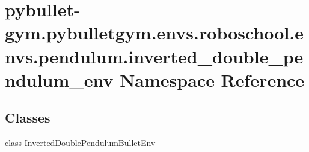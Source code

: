 \hypertarget{namespacepybullet-gym_1_1pybulletgym_1_1envs_1_1roboschool_1_1envs_1_1pendulum_1_1inverted__double__pendulum__env}{}\section{pybullet-\/gym.pybulletgym.\+envs.\+roboschool.\+envs.\+pendulum.\+inverted\+\_\+double\+\_\+pendulum\+\_\+env Namespace Reference}
\label{namespacepybullet-gym_1_1pybulletgym_1_1envs_1_1roboschool_1_1envs_1_1pendulum_1_1inverted__double__pendulum__env}
\subsection*{Classes}
\begin{DoxyCompactItemize}
\item 
class \hyperlink{classpybullet-gym_1_1pybulletgym_1_1envs_1_1roboschool_1_1envs_1_1pendulum_1_1inverted__double__02ae3ce2c545b467956bc876f69901b4}{Inverted\+Double\+Pendulum\+Bullet\+Env}
\end{DoxyCompactItemize}
